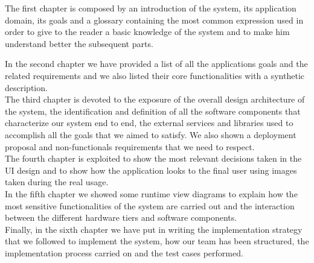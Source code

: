 The first chapter is composed by an introduction of the system, its application domain, its goals and a glossary containing the most common expression used in order to give to the reader a basic knowledge of the system and to make him understand better the subsequent parts.\\\par
In the second chapter we have provided a list of all the applications goals and the related requirements and we also listed their core functionalities with a synthetic description.\\

The third chapter is devoted to the exposure of the overall design architecture of the system, the identification and definition of all the software components that characterize our system end to end, the external services and libraries used to accomplish all the goals that we aimed to satisfy. We also shown a deployment proposal and non-functionals requirements that we need to respect.\\

The fourth chapter is exploited to show the most relevant decisions taken in the UI design and to show how the application looks to the final user using images taken during the real usage.\\

In the fifth chapter we showed some runtime view diagrams to explain how the most sensitive functionalities of the system are carried out and the interaction between the different hardware tiers and software components.\\

Finally, in the sixth chapter we have put in writing the implementation strategy that we followed to implement the system, how our team has been structured, the implementation process carried on and the test cases performed. 
	
	
	
